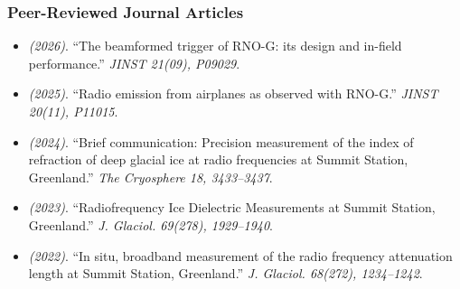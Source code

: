 \subsubsection{Peer-Reviewed Journal Articles}
\begin{itemize}
\item \textit{(2026)}. ``The beamformed trigger of RNO-G: its design and in-field performance.'' \textit{JINST 21(09), P09029}.  
\item \textit{(2025)}. ``Radio emission from airplanes as observed with RNO-G.'' \textit{JINST 20(11), P11015}.  
\item \textit{(2024)}. ``Brief communication: Precision measurement of the index of refraction of deep glacial ice at radio frequencies at Summit Station, Greenland.'' \textit{The Cryosphere 18, 3433--3437}.  
\item \textit{(2023)}. ``Radiofrequency Ice Dielectric Measurements at Summit Station, Greenland.'' \textit{J. Glaciol. 69(278), 1929--1940}.  
\item \textit{(2022)}. ``In situ, broadband measurement of the radio frequency attenuation length at Summit Station, Greenland.'' \textit{J. Glaciol. 68(272), 1234--1242}.  
\end{itemize}
